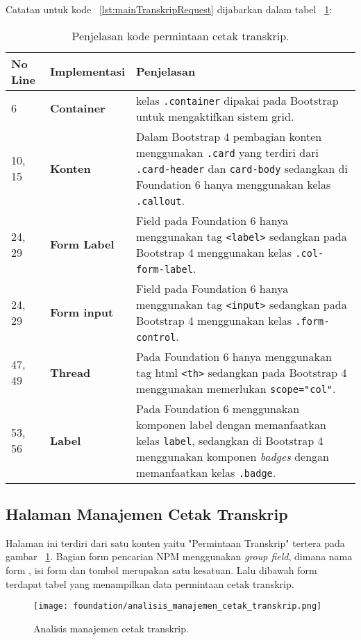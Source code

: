 \noindent Catatan untuk kode ~\ref{lst:mainTranskripRequest} dijabarkan dalam tabel ~\ref{table:kodePermintaanCetakTranskrip}:
\begin{table}[H]
	\centering
	\caption{Penjelasan kode permintaan cetak transkrip.}
	\begin{tabularx}{\textwidth}{llX}
		\toprule
		No Line & Implementasi     & Penjelasan\\
		\midrule
		6 & \textbf{Container} & kelas \texttt{.container} dipakai pada Bootstrap untuk mengaktifkan sistem grid.\\
		10, 15 & \textbf{Konten} & Dalam Bootstrap 4 pembagian konten menggunakan \texttt{.card} yang terdiri dari \texttt{.card-header} dan \texttt{card-body} sedangkan di Foundation 6 hanya menggunakan kelas \texttt{.callout}. \\
		24, 29 & \textbf{Form Label} & Field pada Foundation 6 hanya menggunakan tag \texttt{<label>} sedangkan pada Bootstrap 4 menggunakan kelas \texttt{.col-form-label}.\\
		24, 29 & \textbf{Form input} & Field pada Foundation 6 hanya menggunakan tag \texttt{<input>} sedangkan pada Bootstrap 4 menggunakan kelas \texttt{.form-control}.\\
		47, 49 & \textbf{Thread} & Pada Foundation 6 hanya menggunakan tag html \texttt{<th>} sedangkan pada Bootstrap 4 menggunakan memerlukan \texttt{scope="col"}.\\
		53, 56 & \textbf{Label} & Pada Foundation 6 menggunakan komponen label dengan memanfaatkan kelas \texttt{label}, sedangkan di Bootstrap 4 menggunakan komponen \textit{badges} dengan memanfaatkan kelas \texttt{.badge}.\\
		
		\bottomrule
	\end{tabularx}%
	\label{table:kodePermintaanCetakTranskrip}
\end{table}

\subsection{Halaman Manajemen Cetak Transkrip} 
Halaman ini terdiri dari satu konten yaitu "Permintaan Transkrip" tertera pada gambar ~\ref{fig:analisisManajemenCetakTranskrip}. Bagian form pencarian NPM menggunakan \textit{group field}, dimana nama form , isi form dan tombol merupakan satu kesatuan. Lalu dibawah form terdapat tabel yang menampilkan data permintaan cetak transkrip. 
\begin{figure} [H]
	\centering  
	\texttt{[image: foundation/analisis\_manajemen\_cetak\_transkrip.png]}
	\caption{Analisis manajemen cetak transkrip.} 
	\label{fig:analisisManajemenCetakTranskrip}
\end{figure} 

